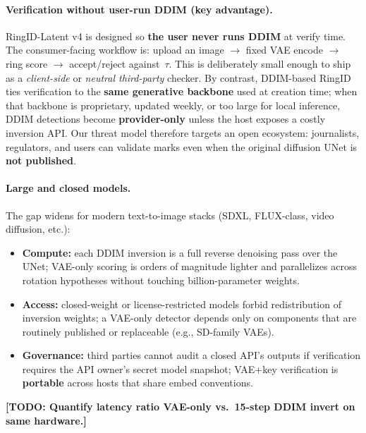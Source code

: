 \documentclass[11pt,a4paper]{article}
\newcommand{\todo}[1]{\textcolor{red!70!black}{\textbf{[TODO: #1]}}}
\begin{document}
\paragraph{Verification without user-run DDIM (key advantage).}
RingID-Latent v4 is designed so \textbf{the user never runs DDIM} at verify time.
The consumer-facing workflow is: upload an image $\rightarrow$ fixed VAE encode $\rightarrow$ ring score $\rightarrow$ accept/reject against~$\tau$.
This is deliberately small enough to ship as a \emph{client-side} or \emph{neutral third-party} checker.
By contrast, DDIM-based RingID ties verification to the \textbf{same generative backbone} used at creation time; when that backbone is proprietary, updated weekly, or too large for local inference, DDIM detections become \textbf{provider-only} unless the host exposes a costly inversion API.
Our threat model therefore targets an open ecosystem: journalists, regulators, and users can validate marks even when the original diffusion UNet is \textbf{not published}.

\paragraph{Large and closed models.}
The gap widens for modern text-to-image stacks (SDXL, FLUX-class, video diffusion, etc.):
\begin{itemize}[nosep]
  \item \textbf{Compute:} each DDIM inversion is a full reverse denoising pass over the UNet; VAE-only scoring is orders of magnitude lighter and parallelizes across rotation hypotheses without touching billion-parameter weights.
  \item \textbf{Access:} closed-weight or license-restricted models forbid redistribution of inversion weights; a VAE-only detector depends only on components that are routinely published or replaceable (e.g., SD-family VAEs).
  \item \textbf{Governance:} third parties cannot audit a closed API's outputs if verification requires the API owner's secret model snapshot; VAE+key verification is \textbf{portable} across hosts that share embed conventions.
\end{itemize}
\todo{Quantify latency ratio VAE-only vs.\ 15-step DDIM invert on same hardware.}
\end{document}
